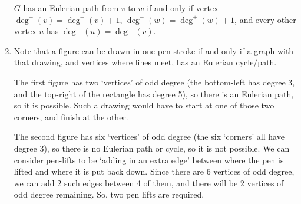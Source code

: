\documentclass[a4paper,12pt]{article}
\begin{document}
\begin{enumerate}
    $G$ has an Eulerian path from $v$ to $w$ if and
    only if vertex $\deg^+(v) = \deg^-(v) + 1$, $\deg^-(w) = \deg^+(w)+1$,
    and every other vertex $u$ has $\deg^+(u) = \deg^-(v)$.
\item
    Note that a figure can be drawn in one pen stroke if and only if a graph
    with that drawing, and vertices where lines meet, has an Eulerian
    cycle/path.

    The first figure has two `vertices' of odd degree (the bottom-left
    has degree 3, and the top-right of the rectangle has degree 5), so there
    is an Eulerian path, so it is possible. Such a drawing would have to start
    at one of those two corners, and finish at the other.

    The second figure has six `vertices' of odd degree (the six `corners' all
    have degree 3), so there is no Eulerian path or cycle, so it is not
    possible. We can consider pen-lifts to be `adding in an extra edge' between
    where the pen is lifted and where it is put back down. Since there are 6
    vertices of odd degree, we can add 2 such edges between 4 of them,
    and there will be 2 vertices of odd degree remaining. So, two pen lifts are
    required.
\end{enumerate}
\end{document}
